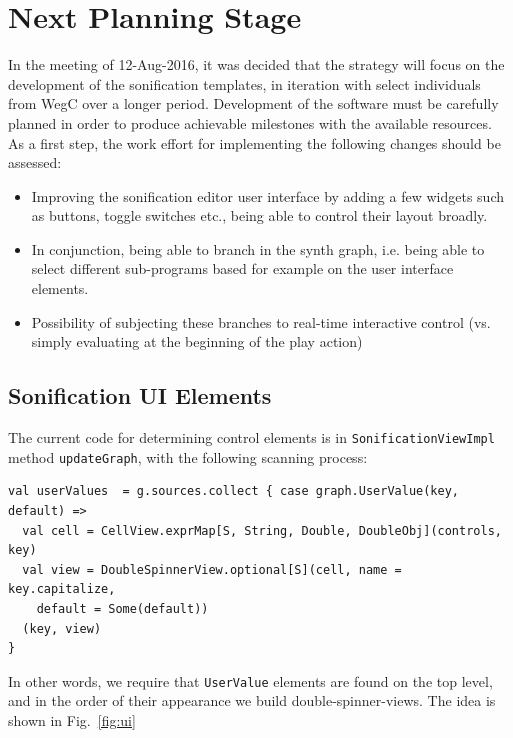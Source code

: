 \documentclass[11pt,a4paper]{article}
\newcommand{\figref}[1]{Fig.~\ref{#1}}
\begin{document}
\section{Next Planning Stage}

In the meeting of 12-Aug-2016, it was decided that the strategy will focus on the development of the sonification templates, in iteration with select individuals from WegC over a longer period. Development of the software must be carefully planned in order to produce achievable milestones with the available resources. As a first step, the work effort for implementing the following changes should be assessed:
%
\begin{itemize}
\item Improving the sonification editor user interface by adding a few widgets such as buttons, toggle switches etc., being able to control their layout broadly.
\item In conjunction, being able to branch in the synth graph, i.e. being able to select different sub-programs based for example on the user interface elements.
\item Possibility of subjecting these branches to real-time interactive control (vs. simply evaluating at the beginning of the play action)
\end{itemize}

\subsection{Sonification UI Elements}

The current code for determining control elements is in \verb!SonificationViewImpl! method \verb!updateGraph!, with the following scanning process:
%
\begin{verbatim}
val userValues  = g.sources.collect { case graph.UserValue(key, default) =>
  val cell = CellView.exprMap[S, String, Double, DoubleObj](controls, key)
  val view = DoubleSpinnerView.optional[S](cell, name = key.capitalize, 
    default = Some(default))
  (key, view)
}
\end{verbatim}
%
In other words, we require that \verb!UserValue! elements are found on the top level, and in the order of their appearance we build double-spinner-views. The idea is shown in \figref{fig:ui}
\end{document}
